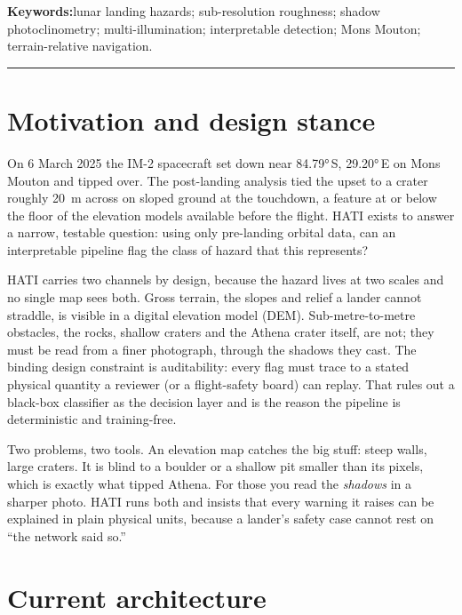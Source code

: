 \documentclass[11pt]{article}
\begin{document}
\noindent\textbf{\sffamily\color{hatiblue}Keywords:}\enspace lunar landing hazards;
sub-resolution roughness; shadow photoclinometry; multi-illumination; interpretable detection;
Mons Mouton; terrain-relative navigation.

\medskip\hrule\medskip

\section{Motivation and design stance}

On 6 March 2025 the IM-2 spacecraft set down near \ang{84.79}\,S, \ang{29.20}\,E on Mons
Mouton and tipped over. The post-landing analysis tied the upset to a crater roughly
\SI{20}{\meter} across on sloped ground at the touchdown, a feature at or below the floor of
the elevation models available before the flight. HATI exists to answer a narrow, testable
question: using only pre-landing orbital data, can an interpretable pipeline flag the class of
hazard that this represents?

HATI carries two channels by design, because the hazard lives at two scales and no single map
sees both. Gross terrain, the slopes and relief a lander cannot straddle, is visible in a
digital elevation model (DEM). Sub-metre-to-metre obstacles, the rocks, shallow craters and
the Athena crater itself, are not; they must be read from a finer photograph, through the
shadows they cast. The binding design constraint is auditability: every flag must trace to a
stated physical quantity a reviewer (or a flight-safety board) can replay. That rules out a
black-box classifier as the decision layer and is the reason the pipeline is deterministic and
training-free.

\begin{plainbox}
Two problems, two tools. An elevation map catches the big stuff: steep walls, large craters.
It is blind to a boulder or a shallow pit smaller than its pixels, which is exactly what
tipped Athena. For those you read the \emph{shadows} in a sharper photo. HATI runs both and
insists that every warning it raises can be explained in plain physical units, because a
lander's safety case cannot rest on ``the network said so.''
\end{plainbox}

\section{Current architecture}
\end{document}
